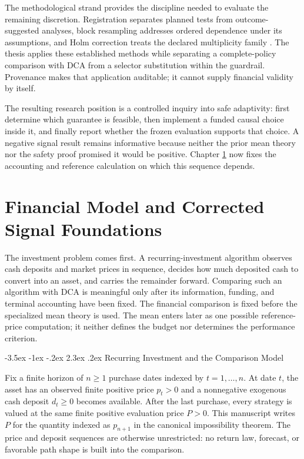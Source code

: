 \documentclass[12pt,a4paper,oneside]{report}
\makeatletter
\renewcommand\section{\@startsection{section}{1}{\z@}%
  {-3.5ex \@plus -1ex \@minus -.2ex}%
  {2.3ex \@plus .2ex}%
  {\normalfont\fontsize{14}{17}\selectfont\bfseries}}
\makeatother
\begin{document}
The methodological strand provides the discipline needed to evaluate the
remaining discretion. Registration separates planned tests from
outcome-suggested analyses, block resampling addresses ordered dependence under
its assumptions, and Holm correction treats the declared multiplicity family
\citep{nosek2018preregistration,kunsch1989blockbootstrap,holm1979}. The thesis
applies these established methods while separating a complete-policy comparison
with DCA from a selector substitution within the guardrail. Provenance makes
that application auditable; it cannot supply financial validity by itself.

The resulting research position is a controlled inquiry into safe adaptivity:
first determine which guarantee is feasible, then implement a funded causal
choice inside it, and finally report whether the frozen evaluation supports
that choice. A negative signal result remains informative because neither the
prior mean theory nor the safety proof promised it would be positive.
Chapter \ref{ch:model-signal} now fixes the accounting and reference calculation
on which this sequence depends.

\chapter{Financial Model and Corrected Signal Foundations}
\label{ch:model-signal}

The investment problem comes first. A recurring-investment algorithm observes
cash deposits and market prices in sequence, decides how much deposited cash to
convert into an asset, and carries the remainder forward. Comparing such an
algorithm with DCA is meaningful only after its information, funding, and
terminal accounting have been fixed. The financial comparison is fixed before
the specialized mean theory is used. The mean enters later as one possible
reference-price computation; it neither defines the budget nor determines the
performance criterion.

\section{Recurring Investment and the Comparison Model}
\label{sec:comparison-model}

Fix a finite horizon of $n\geq1$ purchase dates indexed by
$t=1,\ldots,n$. At date $t$, the asset has an observed finite positive price
$p_t>0$ and a nonnegative exogenous cash deposit $d_t\geq0$ becomes
available. After the last purchase, every strategy is valued at the same
finite positive evaluation price $P>0$. This manuscript writes $P$ for the
quantity indexed as $p_{n+1}$ in the canonical impossibility theorem. The
price and deposit sequences are otherwise unrestricted: no return law,
forecast, or favorable path shape is built into the comparison.
\end{document}
